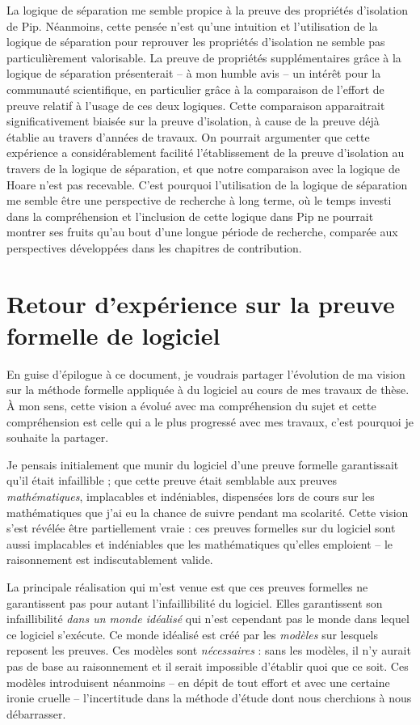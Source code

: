 		La logique de séparation me semble propice à la preuve des propriétés d'isolation de Pip. Néanmoins, cette pensée n'est qu'une intuition et l'utilisation de la logique de séparation pour reprouver les propriétés d'isolation ne semble pas particulièrement valorisable. La preuve de propriétés supplémentaires grâce à la logique de séparation présenterait -- à mon humble avis -- un intérêt pour la communauté scientifique, en particulier grâce à la comparaison de l'effort de preuve relatif à l'usage de ces deux logiques. Cette comparaison apparaitrait significativement biaisée sur la preuve d'isolation, à cause de la preuve déjà établie au travers d'années de travaux. On pourrait argumenter que cette expérience a considérablement facilité l'établissement de la preuve d'isolation au travers de la logique de séparation, et que notre comparaison avec la logique de Hoare n'est pas recevable. C'est pourquoi l'utilisation de la logique de séparation me semble être une perspective de recherche à long terme, où le temps investi dans la compréhension et l'inclusion de cette logique dans Pip ne pourrait montrer ses fruits qu'au bout d'une longue période de recherche, comparée aux perspectives développées dans les chapitres de contribution.

		\section{Retour d'expérience sur la preuve formelle de logiciel}

		En guise d'épilogue à ce document, je voudrais partager l'évolution de ma vision sur la méthode formelle appliquée à du logiciel au cours de mes travaux de thèse. À mon sens, cette vision a évolué avec ma compréhension du sujet et cette compréhension est celle qui a le plus progressé avec mes travaux, c'est pourquoi je souhaite la partager.

		Je pensais initialement que munir du logiciel d'une preuve formelle garantissait qu'il était infaillible ; que cette preuve était semblable aux preuves \emph{mathématiques}, implacables et indéniables, dispensées lors de cours sur les mathématiques que j'ai eu la chance de suivre pendant ma scolarité. Cette vision s'est révélée être partiellement vraie : ces preuves formelles sur du logiciel sont aussi implacables et indéniables que les mathématiques qu'elles emploient -- le raisonnement est indiscutablement valide.

		La principale réalisation qui m'est venue est que ces preuves formelles ne garantissent pas pour autant l'infaillibilité du logiciel. Elles garantissent son infaillibilité \emph{dans un monde idéalisé} qui n'est cependant pas le monde dans lequel ce logiciel s'exécute. Ce monde idéalisé est créé par les \emph{modèles} sur lesquels reposent les preuves. Ces modèles sont \emph{nécessaires} : sans les modèles, il n'y aurait pas de base au raisonnement et il serait impossible d'établir quoi que ce soit. Ces modèles introduisent néanmoins -- en dépit de tout effort et avec une certaine ironie cruelle -- l'incertitude dans la méthode d'étude dont nous cherchions à nous débarrasser.

